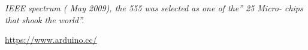 \begin{thebibliography}{99}
 \emph{IEEE spectrum ( May 2009), the 555 was selected as  one of the” 25 Micro- chips that  shook the world”. }

 \url{https://www.arduino.cc/}
\end{thebibliography}